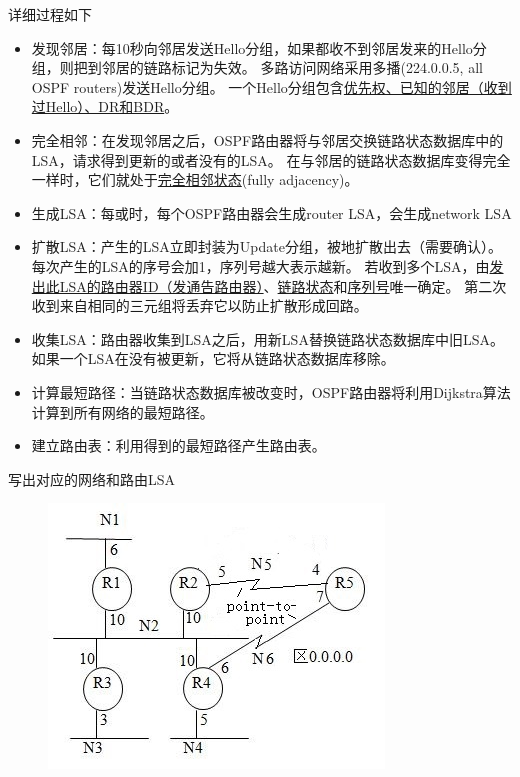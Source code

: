 详细过程如下
\begin{itemize}
	\item 发现邻居：每10秒向邻居发送Hello分组，如果都收不到邻居发来的Hello分组，则把到邻居的链路标记为失效。
	多路访问网络采用多播(224.0.0.5, all OSPF routers)发送Hello分组。
	一个Hello分组包含\underline{优先权、已知的邻居（收到过Hello）、DR和BDR}。
	\item 完全相邻：在发现邻居之后，OSPF路由器将与邻居交换链路状态数据库中的LSA，请求得到更新的或者没有的LSA。
	在与邻居的链路状态数据库变得完全一样时，它们就处于\underline{完全相邻状态}(fully adjacency)。
	\item 生成LSA：每或时，每个OSPF路由器会生成router LSA，会生成network LSA
	\item 扩散LSA：产生的LSA立即封装为Update分组，被地扩散出去（需要确认）。
	每次产生的LSA的序号会加1，序列号越大表示越新。
	若收到多个LSA，由\underline{发出此LSA的路由器ID（发通告路由器）}、\underline{链路状态}和\underline{序列号}唯一确定。
	第二次收到来自相同的三元组将丢弃它以防止扩散形成回路。
	\item 收集LSA：路由器收集到LSA之后，用新LSA替换链路状态数据库中旧LSA。
	如果一个LSA在没有被更新，它将从链路状态数据库移除。
	\item 计算最短路径：当链路状态数据库被改变时，OSPF路由器将利用Dijkstra算法计算到所有网络的最短路径。
	\item 建立路由表：利用得到的最短路径产生路由表。
\end{itemize}
\begin{example}
	写出对应的网络和路由LSA
	\begin{figure}[H]
		\centering
		\includegraphics[width=0.4\linewidth]{fig/ospf_example.jpg}
	\end{figure}
\end{example}
